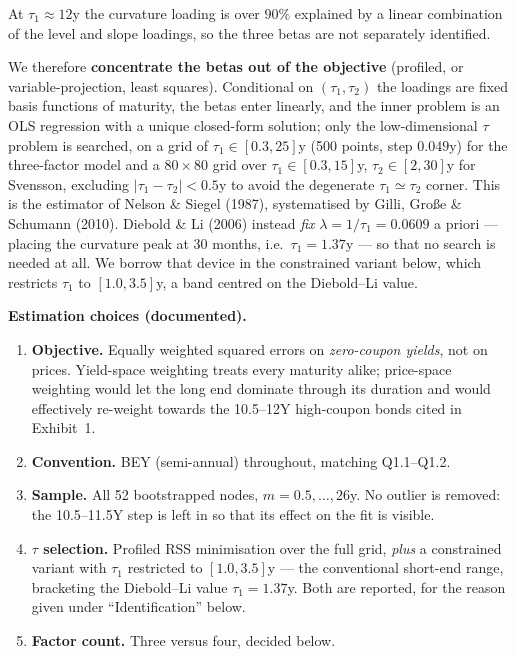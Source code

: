 \documentclass[11pt]{article}
\begin{document}
\noindent At $\tau_1\approx12$y the curvature loading is over $90\%$ explained by a linear combination
of the level and slope loadings, so the three betas are not separately identified.
 
We therefore \textbf{concentrate the betas out of the objective} (profiled, or variable-projection,
least squares). Conditional on $(\tau_1,\tau_2)$ the loadings are fixed basis functions of maturity,
the betas enter linearly, and the inner problem is an OLS regression with a unique closed-form
solution; only the low-dimensional $\tau$ problem is searched, on a grid of
$\tau_1\in[0.3,25]$y (500 points, step $0.049$y) for the three-factor model
and a $80\times80$ grid over $\tau_1\in[0.3,15]$y, $\tau_2\in[2,30]$y for Svensson, excluding
$|\tau_1-\tau_2|<0.5$y to avoid the degenerate $\tau_1\simeq\tau_2$ corner. This is the estimator of Nelson \&
Siegel (1987), systematised by Gilli, Gro\ss e \& Schumann (2010). Diebold \& Li (2006) instead
\emph{fix} $\lambda=1/\tau_1=0.0609$ a priori --- placing the curvature peak at 30 months, i.e.\
$\tau_1=1.37$y --- so that no search is needed at all. We borrow that device in the constrained
variant below, which restricts $\tau_1$ to $[1.0,3.5]$y, a band centred on the Diebold--Li value.
 
\textbf{Estimation choices (documented).}
\begin{enumerate}\itemsep2pt
  \item \textbf{Objective.} Equally weighted squared errors on \emph{zero-coupon yields}, not on
        prices. Yield-space weighting treats every maturity alike; price-space weighting would let
        the long end dominate through its duration and would effectively re-weight towards the
        10.5--12Y high-coupon bonds cited in Exhibit~1.
  \item \textbf{Convention.} BEY (semi-annual) throughout, matching Q1.1--Q1.2.
  \item \textbf{Sample.} All 52 bootstrapped nodes, $m=0.5,\dots,26$y. No outlier is removed: the
        10.5--11.5Y step is left in so that its effect on the fit is visible.
  \item \textbf{$\tau$ selection.} Profiled RSS minimisation over the full grid, \emph{plus} a
        constrained variant with $\tau_1$ restricted to $[1.0,3.5]$y --- the conventional short-end
        range, bracketing the Diebold--Li value $\tau_1=1.37$y. Both are reported, for the reason
        given under ``Identification'' below.
  \item \textbf{Factor count.} Three versus four, decided below.
\end{enumerate}
 
\end{document}
